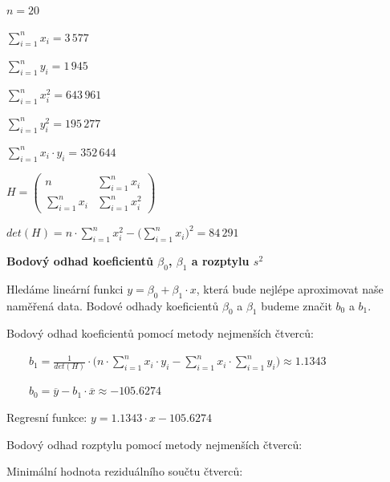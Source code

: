 \documentclass[11pt, a4paper, titlepage]{article}
\begin{document}
\begin{minipage}{0.49\textwidth}
    ${\displaystyle n = 20}$
    \medskip

    ${\displaystyle \sum_{i=1}^n x_i = 3 \, 577}$
    \medskip

    ${\displaystyle \sum_{i=1}^n y_i = 1 \, 945}$
\end{minipage}
%
\begin{minipage}{0.49\textwidth}
    ${\displaystyle \sum_{i=1}^n x_i^2 = 643 \, 961}$
    \medskip

    ${\displaystyle \sum_{i=1}^n y_i^2 = 195 \, 277}$
    \medskip

    ${\displaystyle \sum_{i=1}^n x_i \cdot y_i = 352 \, 644}$
\end{minipage}

${\displaystyle
H = \begin{pmatrix}
    n & \sum\limits_{i=1}^n x_i \\
    \sum\limits_{i=1}^n x_i & \sum\limits_{i=1}^n x_i^2
\end{pmatrix}
}$
\medskip

${\displaystyle det(H) = n \cdot \sum_{i=1}^n x_i^2 - \Bigg( \sum_{i=1}^n x_i \Bigg)^2 = 84 \, 291}$
\bigskip
\bigskip



\textbf{Bodový odhad koeficientů ${\displaystyle \beta_0}$, ${\displaystyle \beta_1}$ a rozptylu ${\displaystyle s^2}$}
\medskip

Hledáme lineární funkci ${\displaystyle y = \beta_0 + \beta_1 \cdot x}$, která bude nejlépe aproximovat naše naměřená data. Bodové odhady koeficientů ${\displaystyle \beta_0}$ a ${\displaystyle \beta_1}$ budeme značit ${\displaystyle b_0}$ a ${\displaystyle b_1}$.
\medskip

Bodový odhad koeficientů pomocí metody nejmenších čtverců:
\medskip

${\displaystyle \qquad b_1 = \frac{1} {det(H)} \cdot \Bigg( n \cdot \sum_{i=1}^n x_i \cdot y_i - \sum_{i=1}^n x_i \cdot \sum_{i=1}^n y_i \Bigg) \approx 1.1343 }$
\medskip

${\displaystyle \qquad b_0 = \overline{y} - b_1 \cdot \overline{x} \approx -105.6274}$
\medskip

\qquad Regresní funkce: ${\displaystyle y = 1.1343 \cdot x - 105.6274}$
\medskip

Bodový odhad rozptylu pomocí metody nejmenších čtverců:
\medskip

\qquad Minimální hodnota reziduálního součtu čtverců:
\medskip
\end{document}
